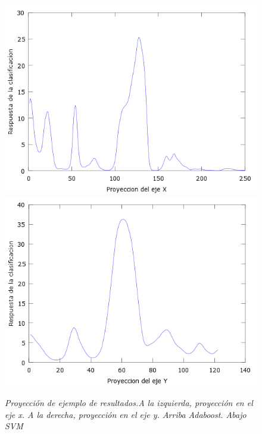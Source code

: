 \begin{figure}[H]
  \includegraphics[scale=.4]{images/plots/svm1X}
  \includegraphics[scale=.4]{images/plots/svm1Y}
  \caption{\em  Proyección de ejemplo de resultados.A la izquierda, proyección en el eje x. A la derecha, proyección en el eje y. Arriba Adaboost. Abajo SVM}     
  \label{fig:pro1}
\end{figure}

